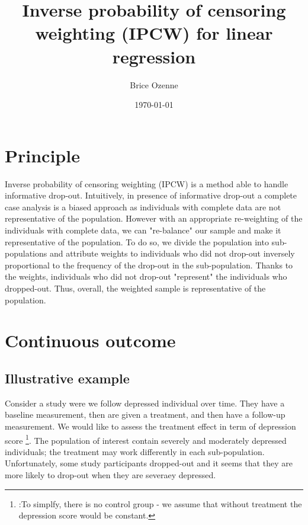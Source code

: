 \documentclass[12pt]{article}
\author{Brice Ozenne}
\date{\today}
\title{Inverse probability of censoring weighting (IPCW) for linear regression}
\begin{document}
\maketitle

\section{Principle}
\label{sec:org117588c}

Inverse probability of censoring weighting (IPCW) is a method able to
handle informative drop-out. Intuitively, in presence of informative
drop-out a complete case analysis is a biased approach as individuals
with complete data are not representative of the population. However
with an appropriate re-weighting of the individuals with complete
data, we can "re-balance" our sample and make it representative of the
population. To do so, we divide the population into sub-populations
and attribute weights to individuals who did not drop-out inversely
proportional to the frequency of the drop-out in the
sub-population. Thanks to the weights, individuals who did not
drop-out "represent" the individuals who dropped-out. Thus, overall,
the weighted sample is representative of the population.

\section{Continuous outcome}
\label{sec:orgf72405c}

\subsection{Illustrative example}
\label{sec:org4e847c8}

Consider a study were we follow depressed individual over time. They
have a baseline measurement, then are given a treatment, and then have
a follow-up measurement. We would like to assess the treatment effect
in term of depression score \footnote{:To simplfy, there is no control
group - we assume that without treatment the depression score would be
constant.}. The population of interest contain severely and moderately
depressed individuals; the treatment may work differently in each
sub-population. Unfortunately, some study participants dropped-out and
it seems that they are more likely to drop-out when they are severaey
depressed.

\clearpage
\end{document}
